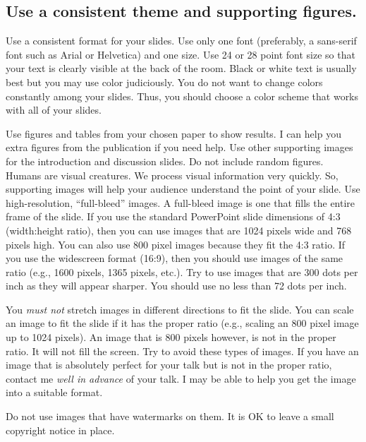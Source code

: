 \documentclass[letterpaper]{memoir}
\newcommand{\insertslide}[2]{%
  \framebox{\texttt{[image: \#2]}}
}
\begin{document}
\subsection*{Use a consistent theme and supporting figures.}


Use a consistent format for your slides. Use only one font (preferably, a sans-serif font such as Arial or Helvetica) and one size. Use 24 or 28 point font size so that your text is clearly visible at the back of the room. Black or white text is usually best but you may use color judiciously. You do not want to change colors constantly among your slides. Thus, you should choose a color scheme that works with all of your slides. 


Use figures and tables from your chosen paper to show results. I can help you extra figures from the publication if you need help. Use other supporting images for the introduction and discussion slides.\sidepar{\insertslide{9}{5_in_5_overview.pdf}} 
Do not include random figures. Humans are visual creatures. We process visual information very quickly. So, supporting images will help your audience understand the point of your slide.  Use high-resolution, “full-bleed” images. A full-bleed image is one that fills the entire frame of the slide.  If you use the standard PowerPoint slide dimensions of 4:3 (width:height ratio), then you can use images that are 1024 pixels wide and 768 pixels high. You can also use 800 pixel images because they fit the 4:3 ratio. If you use the widescreen format (16:9), then you should use images of the same ratio (e.g., 1600 pixels, 1365 pixels, etc.). Try to use images that are 300 dots per inch as they will appear sharper. You should use no less than 72 dots per inch.

You \emph{must not} stretch images in different directions to fit the slide. You can scale an image to fit the slide if it has the proper ratio (e.g., scaling an 800 pixel image up to 1024 pixels). An image that is 800 pixels however, is not in the proper ratio. It will not fill the screen.  Try to avoid these types of images.  If you have an image that is absolutely perfect for your talk but is not in the proper ratio, contact me \emph{well in advance} of your talk. I may be able to help you get the image into a suitable format.

Do not use images that have watermarks on them. It is OK to leave a small copyright notice in place. \sidepar{\insertslide{15}{5_in_5_overview.pdf}}
\end{document}
